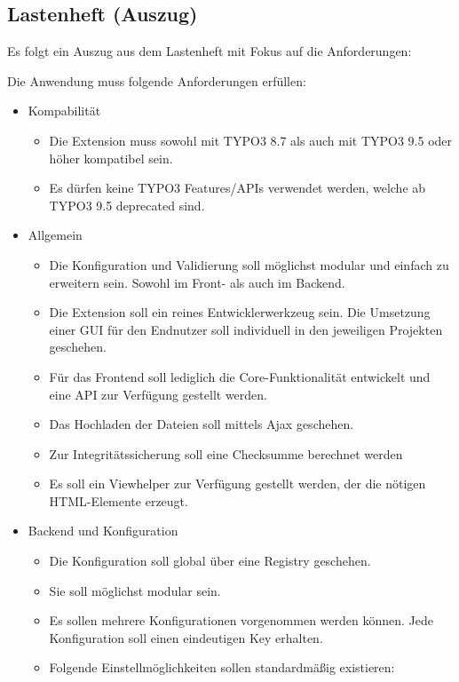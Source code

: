 \subsection{Lastenheft (Auszug)}
\label{app:Lastenheft}
Es folgt ein Auszug aus dem Lastenheft mit Fokus auf die Anforderungen:

Die Anwendung muss folgende Anforderungen erfüllen: 
\begin{itemize}[itemsep=0em,partopsep=0em,parsep=0em,topsep=0em]
	\item Kompabilität
		\begin{itemize}
			\item Die Extension muss sowohl mit TYPO3 8.7 als auch mit TYPO3 9.5 oder höher kompatibel sein.
			\item Es dürfen keine TYPO3 Features/APIs verwendet werden, welche ab TYPO3 9.5 deprecated sind.
		\end{itemize}
	\item Allgemein
		\begin{itemize}
			\item Die Konfiguration und Validierung soll möglichst modular und einfach zu erweitern sein. Sowohl im Front- als auch im Backend.
			\item Die Extension soll ein reines Entwicklerwerkzeug sein. Die Umsetzung einer GUI für den Endnutzer soll individuell in den jeweiligen Projekten geschehen.
			\item Für das Frontend soll lediglich die Core-Funktionalität entwickelt und eine API zur Verfügung gestellt werden.
			\item Das Hochladen der Dateien soll mittels Ajax geschehen.
			\item Zur Integritätssicherung soll eine Checksumme berechnet werden
			\item Es soll ein Viewhelper zur Verfügung gestellt werden, der die nötigen HTML-Elemente erzeugt.
		\end{itemize}
	\item Backend und Konfiguration
		\begin{itemize}
			\item Die Konfiguration soll global über eine Registry geschehen.
			\item Sie soll möglichst modular sein.
			\item Es sollen mehrere Konfigurationen vorgenommen werden können. Jede Konfiguration soll einen eindeutigen Key erhalten.
			\item Folgende Einstellmöglichkeiten sollen standardmäßig existieren:

\end{itemize}
\end{itemize}
